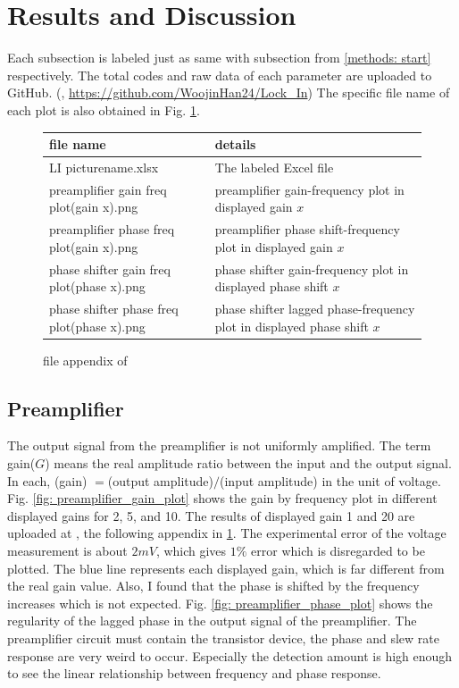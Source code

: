 \documentclass{article}
\begin{document}
\section{Results and Discussion}
\label{results: start}
 Each subsection is labeled just as same with subsection from \ref{methods: start} respectively.
 The total codes and raw data of each parameter are uploaded to GitHub.
 (\cite{github}, \url{https://github.com/WoojinHan24/Lock_In})
 The specific file name of each plot is also obtained in Fig. \ref{fig: file_appendix}.

\begin{figure}[H]
    \begin{tabular}{  m{6.2cm} | m{7.7cm}  } 

      file name& details \\ 
      \hline
        LI picturename.xlsx & The labeled Excel file\\
      \hline
        preamplifier gain freq plot(gain x).png & preamplifier gain-frequency plot in displayed gain $x$\\
      \hline
        preamplifier phase freq plot(gain x).png & preamplifier phase shift-frequency plot in displayed gain $x$\\
      \hline
        phase shifter gain freq plot(phase x).png & phase shifter gain-frequency plot in displayed phase shift $x$\\
      \hline
        phase shifter phase freq plot(phase x).png & phase shifter lagged phase-frequency plot in displayed phase shift $x$
        
    \end{tabular}
    \caption{file appendix of \cite{github}}
    \label{fig: file_appendix}
\end{figure}

\subsection{Preamplifier}
 The output signal from the preamplifier is not uniformly amplified.
 The term gain($G$) means the real amplitude ratio between the input and the output signal.
 In each, (gain) $=$(output amplitude)$/$(input amplitude) in the unit of voltage.
 Fig. \ref{fig: preamplifier_gain_plot} shows the gain by frequency plot in different displayed gains for 2, 5, and 10.
 The results of displayed gain 1 and 20 are uploaded at \cite{github}, the following appendix in \ref{fig: file_appendix}.
 The experimental error of the voltage measurement is about $2mV$, which gives $1\%$ error which is disregarded to be plotted.
 The blue line represents each displayed gain, which is far different from the real gain value.
 Also, I found that the phase is shifted by the frequency increases which is not expected.
 Fig. \ref{fig: preamplifier_phase_plot} shows the regularity of the lagged phase in the output signal of the preamplifier.
 The preamplifier circuit must contain the transistor device, the phase and slew rate response are very weird to occur.
 Especially the detection amount is high enough to see the linear relationship between frequency and phase response.
\end{document}
